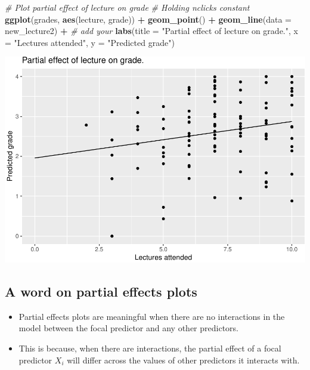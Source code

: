 \documentclass[
]{article}
\newenvironment{Shaded}{\begin{snugshade}}{\end{snugshade}}
\newcommand{\AttributeTok}[1]{\textcolor[rgb]{0.13,0.29,0.53}{#1}}
\newcommand{\CommentTok}[1]{\textcolor[rgb]{0.56,0.35,0.01}{\textit{#1}}}
\newcommand{\FunctionTok}[1]{\textcolor[rgb]{0.13,0.29,0.53}{\textbf{#1}}}
\newcommand{\NormalTok}[1]{#1}
\newcommand{\SpecialCharTok}[1]{\textcolor[rgb]{0.81,0.36,0.00}{\textbf{#1}}}
\newcommand{\StringTok}[1]{\textcolor[rgb]{0.31,0.60,0.02}{#1}}
\providecommand{\tightlist}{%
  \setlength{\itemsep}{0pt}\setlength{\parskip}{0pt}}
\begin{document}
\begin{Shaded}
\begin{Highlighting}[]
\CommentTok{\# Plot partial effect of lecture on grade}
\CommentTok{\# Holding \textasciigrave{}nclicks\textasciigrave{} constant}
\FunctionTok{ggplot}\NormalTok{(grades, }\FunctionTok{aes}\NormalTok{(lecture, grade)) }\SpecialCharTok{+} 
  \FunctionTok{geom\_point}\NormalTok{() }\SpecialCharTok{+}
  \FunctionTok{geom\_line}\NormalTok{(}\AttributeTok{data =}\NormalTok{ new\_lecture2) }\SpecialCharTok{+} \CommentTok{\# add your }
  \FunctionTok{labs}\NormalTok{(}\AttributeTok{title =} \StringTok{"Partial effect of lecture on grade."}\NormalTok{, }
       \AttributeTok{x =} \StringTok{"Lectures attended"}\NormalTok{,}
       \AttributeTok{y =} \StringTok{"Predicted grade"}\NormalTok{)}
\end{Highlighting}
\end{Shaded}

\includegraphics{L8_Multiple_regression_pdf_files/figure-latex/unnamed-chunk-10-1.pdf}

\hypertarget{a-word-on-partial-effects-plots}{%
\subsection{A word on partial effects
plots}\label{a-word-on-partial-effects-plots}}

\begin{itemize}
\tightlist
\item
  Partial effects plots are meaningful when there are no interactions in
  the model between the focal predictor and any other predictors.
\item
  This is because, when there are interactions, the partial effect of a
  focal predictor \(X_i\) will differ across the values of other
  predictors it interacts with.
\end{itemize}
\end{document}
